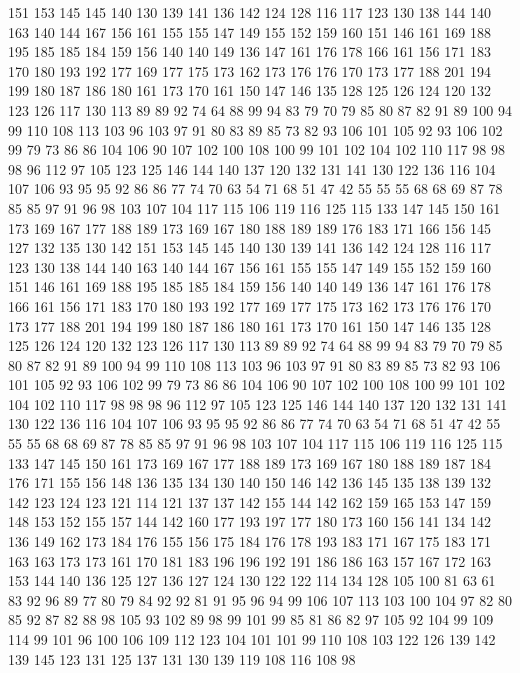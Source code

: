 151 153 145 145 140 130 139 141 136 142 124 128 116 117 123 130 138 144 140 163
140 144 167 156 161 155 155 147 149 155 152 159 160 151 146 161 169 188 195 185
185 184 159 156 140 140 149 136 147 161 176 178 166 161 156 171 183 170 180 193
192 177 169 177 175 173 162 173 176 176 170 173 177 188 201 194 199 180 187 186
180 161 173 170 161 150 147 146 135 128 125 126 124 120 132 123 126 117 130 113
89 89 92 74 64 88 99 94 83 79 70 79 85 80 87 82 91 89 100 94
99 110 108 113 103 96 103 97 91 80 83 89 85 73 82 93 106 101 105 92
93 106 102 99 79 73 86 86 104 106 90 107 102 100 108 100 99 101 102 104
102 110 117 98 98 98 96 112 97 105 123 125 146 144 140 137 120 132 131 141
130 122 136 116 104 107 106 93 95 95 92 86 86 77 74 70 63 54 71 68
51 47 42 55 55 55 68 68 69 87 78 85 85 97 91 96 98 103 107 104
117 115 106 119 116 125 115 133 147 145 150 161 173 169 167 177 188 189 173 169
167 180 188 189 189 176 183 171 166 156 145 127 132 135 130 142 151 153 145 145
140 130 139 141 136 142 124 128 116 117 123 130 138 144 140 163 140 144 167 156
161 155 155 147 149 155 152 159 160 151 146 161 169 188 195 185 185 184 159 156
140 140 149 136 147 161 176 178 166 161 156 171 183 170 180 193 192 177 169 177
175 173 162 173 176 176 170 173 177 188 201 194 199 180 187 186 180 161 173 170
161 150 147 146 135 128 125 126 124 120 132 123 126 117 130 113 89 89 92 74
64 88 99 94 83 79 70 79 85 80 87 82 91 89 100 94 99 110 108 113
103 96 103 97 91 80 83 89 85 73 82 93 106 101 105 92 93 106 102 99
79 73 86 86 104 106 90 107 102 100 108 100 99 101 102 104 102 110 117 98
98 98 96 112 97 105 123 125 146 144 140 137 120 132 131 141 130 122 136 116
104 107 106 93 95 95 92 86 86 77 74 70 63 54 71 68 51 47 42 55
55 55 68 68 69 87 78 85 85 97 91 96 98 103 107 104 117 115 106 119
116 125 115 133 147 145 150 161 173 169 167 177 188 189 173 169 167 180 188 189
187 184 176 171 155 156 148 136 135 134 130 140 150 146 142 136 145 135 138 139
132 142 123 124 123 121 114 121 137 137 142 155 144 142 162 159 165 153 147 159
148 153 152 155 157 144 142 160 177 193 197 177 180 173 160 156 141 134 142 136
149 162 173 184 176 155 156 175 184 176 178 193 183 171 167 175 183 171 163 163
173 173 161 170 181 183 196 196 192 191 186 186 163 157 167 172 163 153 144 140
136 125 127 136 127 124 130 122 122 114 134 128 105 100 81 63 61 83 92 96
89 77 80 79 84 92 92 81 91 95 96 94 99 106 107 113 103 100 104 97
82 80 85 92 87 82 88 98 105 93 102 89 98 99 101 99 85 81 86 82
97 105 92 104 99 109 114 99 101 96 100 106 109 112 123 104 101 101 99 110
108 103 122 126 139 142 139 145 123 131 125 137 131 130 139 119 108 116 108 98
